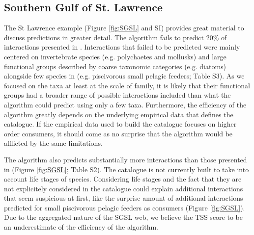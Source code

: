\documentclass[letterpaper]{article}
\begin{document}
\subsection{Southern Gulf of St. Lawrence}
The St Lawrence example (Figure \ref{fig:SGSL} and SI) provides great material to discuss predictions in greater detail. The algorithm fails to predict 20\% of interactions presented in \citet{Savenkoff2004}. Interactions that failed to be predicted were mainly centered on invertebrate species (e.g. polychaetes and mollusks) and large functional groups described by coarse taxonomic categories (e.g. diatoms) alongside few species in \citet{Savenkoff2004} (e.g. piscivorous small pelagic feeders; Table S3). As we focused on the taxa at least at the scale of family, it is likely that their functional groups had a broader range of possible interactions included than what the algorithm could predict using only a few taxa. Furthermore, the efficiency of the algorithm greatly depends on the underlying empirical data that defines the catalogue. If the empirical data used to build the catalogue focuses on higher order consumers, it should come as no surprise that the algorithm would be afflicted by the same limitations.

The algorithm also predicts substantially more interactions than those presented in \citet{Savenkoff2004} (Figure \ref{fig:SGSL}; Table S2). The catalogue is not currently built to take into account life stages of species. Considering life stages and the fact that they are not explicitely considered in the catalogue could explain additional interactions that seem suspicious at first, like the surprise amount of additional interactions predicted for small piscivorous pelagic feeders as consumers (Figure \ref{fig:SGSL}). Due to the aggregated nature of the SGSL web, we believe the TSS score to be an underestimate of the efficiency of the algorithm.
\end{document}
